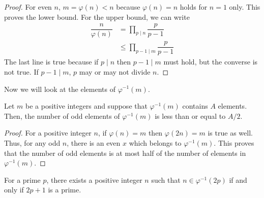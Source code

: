 	\begin{proof}
		For even $n$, $m=\varphi(n)<n$ because $\varphi(n)=n$ holds for $n=1$ only. This proves the lower bound. For the upper bound, we can write
			\begin{align*}
				\dfrac{n}{\varphi(n)} & = \prod_{p\mid n}\dfrac{p}{p-1}\\
						  & \leq \prod_{p-1\mid m}\dfrac{p}{p-1}
			\end{align*}
		The last line is true because if $p\mid n$ then $p-1\mid m$ must hold, but the converse is not true. If $p-1\mid m$, $p$ may or may not divide $n$.
	\end{proof}

Now we will look at the elements of $\varphi^{-1}(m)$.
	\begin{theorem}
		Let $m$ be a positive integers and suppose that $\varphi^{-1}(m)$ contains $A$ elements. Then, the number of odd elements of $\varphi^{-1}(m)$ is less than or equal to $A/2$.
	\end{theorem}

	\begin{proof}
		For a positive integer $n$, if $\varphi(n)=m$ then $\varphi(2n)=m$ is true as well. Thus, for any odd $n$, there is an even $x$ which belongs to $\varphi^{-1}(m)$. This proves that the number of odd elements is at most half of the number of elements in $\varphi^{-1}(m)$.
	\end{proof}

	\begin{theorem}
		For a prime $p$, there exists a positive integer $n$ such that $n\in\varphi^{-1}(2p)$ if and only if $2p+1$ is a prime.
	\end{theorem}

